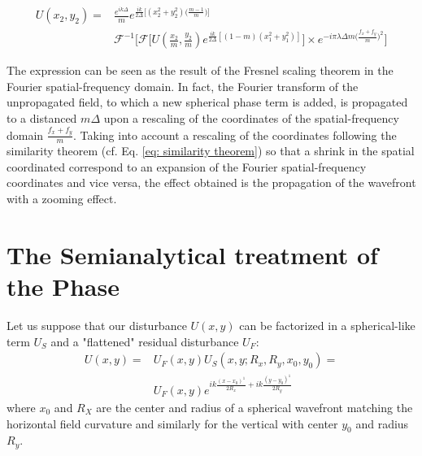 \documentclass{iucr}              %
\begin{document}
\begin{equation}
	\begin{aligned}
	U(x_2, y_2) = &\frac { e^{ik\Delta}}{m} e^{\frac{ik}{2 \Delta} \big[(x_2^2 + y_2^2)\big(\frac{m - 1}{m}\big)\big]}\\ &\mathcal{F}^{-1}\Big[\mathcal{F}\big[U(\frac{x_2}{m}, \frac{y_2}{m})e^{\frac{ik}{2 \Delta } [(1-m)(x_1^2+y_1^2)]}\big]\times e^{-i \pi \lambda \Delta m \big(\frac{f_x+f_y}{m}\big)^2 }\Big]
	\end{aligned}
\end{equation}

The expression can be seen as the result of the Fresnel scaling theorem in the Fourier spatial-frequency domain. In fact, the Fourier transform of the unpropagated field, to which a new spherical phase term is added, is propagated to a distanced $m\Delta$ upon a rescaling of the coordinates of the spatial-frequency domain $\frac{f_x+f_y}{m}$. Taking into account a rescaling of the coordinates following the similarity theorem (cf. Eq. \ref{eq: similarity theorem}) so that a shrink in the spatial coordinated correspond to an expansion of the Fourier spatial-frequency coordinates and vice versa, the effect obtained is the propagation of the wavefront with a zooming effect.


\section{The Semianalytical treatment of the Phase}
\label{appendix_srw}
Let us suppose that our disturbance $U(x,y)$ can be factorized in a spherical-like term $U_S$ and a "flattened" residual disturbance $U_F$: 
\begin{equation}\label{eq: toroidal_phase}
	\begin{aligned}
	U(x, y) = & U_F(x,y) U_S(x,y;R_x,R_y,x_0,y_0) = \\
	          & U_F(x,y) e^{i k \frac{(x-x_0)^1}{2R_x}+i k \frac{(y-y_0)^1}{2R_y}}
\end{aligned}
\end{equation}
where $x_0$ and $R_X$ are the center and radius of a spherical wavefront matching the horizontal field curvature and similarly for the vertical with center $y_0$ and radius $R_y$. 
\end{document}

